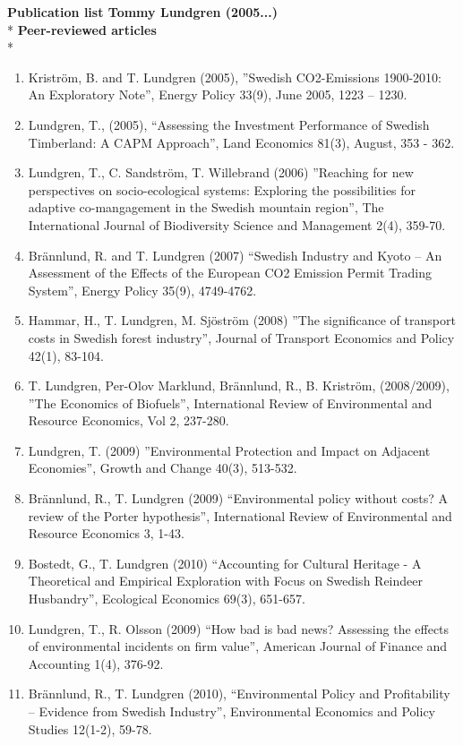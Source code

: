 \textbf{Publication list Tommy Lundgren (2005...)}\\*
\textbf{Peer-reviewed articles}\\*
\begin{enumerate}
	\item Kriström, B. and T. Lundgren (2005), ”Swedish CO2-Emissions 1900-2010: An Exploratory Note”, Energy Policy 33(9), June 2005, 1223 – 1230.
	\item Lundgren, T., (2005), “Assessing the Investment Performance of Swedish Timberland: A CAPM Approach”, Land Economics 81(3), August, 353 - 362.
	\item Lundgren, T., C. Sandström, T. Willebrand  (2006) ”Reaching for new perspectives on socio-ecological systems: Exploring the possibilities for adaptive co-mangagement in the Swedish mountain region”, The International Journal of Biodiversity Science and Management 2(4), 359-70.
	\item Brännlund, R. and T. Lundgren (2007) “Swedish Industry and Kyoto – An Assessment of the Effects of the European CO2 Emission Permit Trading System”, Energy Policy 35(9), 4749-4762.
	\item Hammar, H., T. Lundgren, M. Sjöström (2008) ”The significance of transport costs in Swedish forest industry”, Journal of Transport Economics and Policy 42(1), 83-104.
	\item T. Lundgren, Per-Olov Marklund, Brännlund, R., B. Kriström, (2008/2009), ”The Economics of Biofuels”,  International Review of Environmental and Resource Economics, Vol 2, 237-280.
	\item Lundgren, T. (2009) ”Environmental Protection and Impact on Adjacent Economies”, Growth and Change 40(3), 513-532.
	\item Brännlund, R., T. Lundgren (2009) “Environmental policy without costs? A review of the Porter hypothesis”, International Review of Environmental and Resource Economics 3, 1-43.
	\item Bostedt, G., T. Lundgren (2010) “Accounting for Cultural Heritage - A Theoretical and Empirical Exploration with Focus on Swedish Reindeer Husbandry”, Ecological Economics 69(3), 651-657.
	\item Lundgren, T., R. Olsson (2009) “How bad is bad news? Assessing the effects of environmental incidents on firm value”, American Journal of Finance and Accounting 1(4), 376-92.
	\item Brännlund, R., T. Lundgren (2010), “Environmental Policy and Profitability – Evidence from Swedish Industry”, Environmental Economics and Policy Studies 12(1-2), 59-78.

\end{enumerate}
